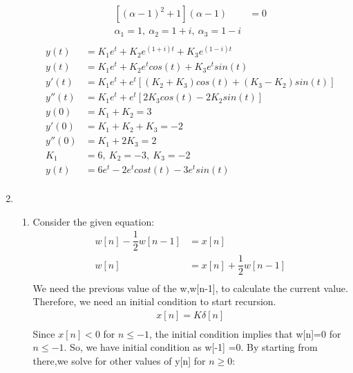 \documentclass[10pt,a4paper, margin=1in]{article}
\begin{document}
\begin{enumerate}
\begin{enumerate}
\begin{equation}
\begin{split}
	    [(\alpha-1)^2+1](\alpha-1) &= 0\\
	    \alpha_1 = 1, \ \alpha_2 = 1+i, \ \alpha_3 = 1-i\\
	\end{split}	
    \end{equation}
    \begin{equation}
	\begin{split}
        y(t) &= K_1 e^t + K_2 e^{(1+i)t} + K_3 e^{(1-i)t}\\
	    y(t) &= K_1 e^t + K_2 e^t cos(t) + K_3 e^t sin(t)\\
	    y'(t) &= K_1 e^t + e^t [(K_2 + K_3) cos(t) + (K_3 - K_2) sin(t)]\\
	    y''(t) &= K_1 e^t + e^t [2K_3 cos(t) - 2K_2 sin(t)]\\
	    y(0) &= K_1 + K_2 = 3\\
	    y'(0) &= K_1 + K_2 + K_3 = -2\\
	    y''(0) &= K_1 + 2K_3 = 2\\
	    K_1 &= 6, \ K_2 = -3, \ K_3 = -2\\
	    y(t) &= 6e^t -2 e^t cost(t) -3 e^t sin(t)\\
	\end{split}	
    \end{equation}
    \end{enumerate}


\item %
    \begin{enumerate}
    \item %
    Consider the given equation:
    \begin{equation}
	\begin{split}
	w[n] - \dfrac{1}{2} w[n-1] & =  x[n] \\
	w[n] & = x[n]+ \dfrac{1}{2}w[n-1] \\
\end{split}
	\end{equation}
	We need the previous value of the w,w[n-1], to calculate the current value. Therefore, we need an initial condition to start recursion. \\
	 \begin{equation}
	\begin{split}
	 x[n] = K \delta[n] \\
	\end{split}
	\end{equation}
	Since $x[n]<0$ for $n \leq -1$, the initial condition implies that w[n]=0 for $n\leq -1$. So, we have initial condition as w[-1] =0. By starting from there,we solve for other values of y[n] for $n\geq 0 : $\\
	

\end{enumerate}
\end{enumerate}
\end{document}

